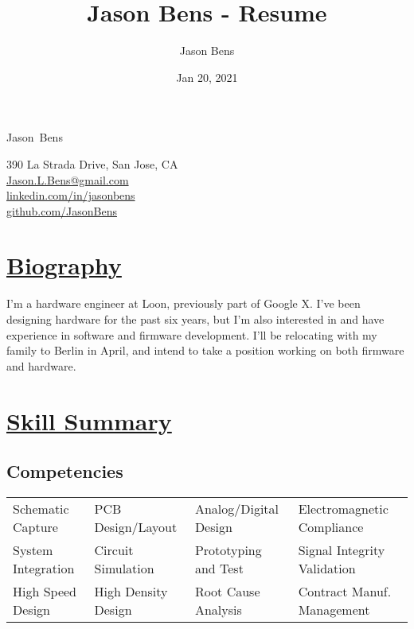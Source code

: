 \documentclass[a4paper, 11pt]{article}
\title{Jason Bens - Resume}
\author{Jason Bens}
\date{Jan 20, 2021}
\makeatletter
\newcommand {\firstname} {Jason}
\newcommand {\lastname} {Bens}
\newcommand {\address} {390 La Strada Drive, San Jose, CA}
\newcommand {\email} {\url{Jason.L.Bens@gmail.com}}
\newcommand {\linkedin} {\url{linkedin.com/in/jasonbens}}
\newcommand {\github} {\url{github.com/JasonBens}}
\newcommand {\careers} {\url{careers.stackoverflow.com/JasonBens}}
\makeatother
\begin{document}
\begin{minipage}[t]{0.4\textwidth}  
  \begin{flushright}
    {\Huge \firstname~\lastname}
  \end{flushright}
\end{minipage}
\hfill
\begin{minipage}{0.42\textwidth}
  \begin{flushright}
    \address \\
    \email \\
    \linkedin \\
    \github \\
  \end{flushright}
\end{minipage}

\hrulefill

\section{\underline{Biography}}
I'm a hardware engineer at Loon, previously part of Google X.  I've been designing hardware for the past six years, but I'm also interested in and have experience in software and firmware development.  I'll be relocating with my family to Berlin in April, and intend to take a position working on both firmware and hardware.

\section{\underline{Skill Summary}}
  \subsection{\textbf{Competencies}}
  \begin{tabular}{l l l l}
    Schematic Capture & PCB Design/Layout & Analog/Digital Design & Electromagnetic Compliance\\
    System Integration & Circuit Simulation & Prototyping and Test & Signal Integrity Validation\\
    High Speed Design & High Density Design & Root Cause Analysis & Contract Manuf. Management\\
  \end{tabular}
\end{document}
